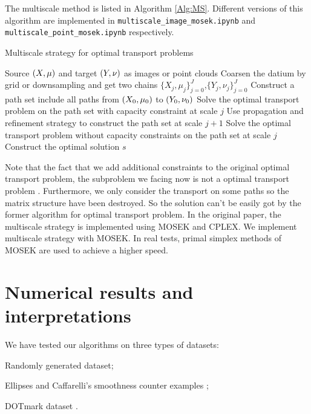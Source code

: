 \documentclass[english]{pkupaper}
\begin{document}
The multiscale method is listed in Algorithm \ref{Alg:MS}. Different versions of this algorithm are implemented in \verb"multiscale_image_mosek.ipynb" and \verb"multiscale_point_mosek.ipynb" respectively.

\begin{algorithm}
\caption{Multiscale strategy for optimal transport problems} \label{Alg:MS}
\begin{algorithmic}
\REQUIRE Source $ \left(  X, \mu  \right) $ and target $ \left(  Y, \nu  \right) $ as images or point clouds
\STATE Coarsen the datium by grid or downsampling and get two chains $\{ X_j, \mu_j \}^J_{j=0}$,$\{Y_j, \nu_j\}^J_{j=0}$
\STATE Construct a path set include all paths from $\left( X_0, \mu_0 \right)$ to $\left( Y_0, \nu_0 \right)$
\STATE Solve the optimal transport problem on the path set with capacity constraint at scale $j$
\STATE Use propagation and refinement strategy to construct the path set at scale $j + 1$
\ENDFOR
\STATE Solve the optimal transport problem without capacity constraints on the path set at scale $j$
\STATE Construct the optimal solution $s$
\end{algorithmic}
\end{algorithm}

Note that the fact that we add additional constraints to the original optimal transport problem, the subproblem we facing now is not a optimal transport problem . Furthermore, we only consider the transport on some paths so the matrix structure have been destroyed. So the solution can't be easily got by the former algorithm for optimal transport problem. In the original paper, the multiscale strategy is implemented using MOSEK and CPLEX. We implement multiscale strategy with MOSEK. In real tests, primal simplex methods of MOSEK are used to achieve a higher speed.

\section{Numerical results and interpretations} \label{Sec:NumRes}

We have tested our algorithms on three types of datasets:
\begin{partlist}
\item Randomly generated dataset;
\item Ellipses and Caffarelli's smoothness counter examples \parencite{Gerber2017};
\item DOTmark dataset \parencite{Schrieber2017}.
\end{partlist}
\end{document}
